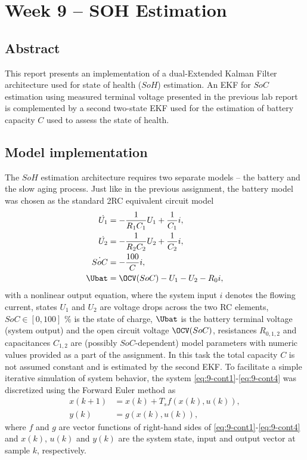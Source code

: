 
\chapter{Week 9 -- SOH Estimation}

\section{Abstract}
This report presents an implementation of a dual-Extended Kalman Filter architecture used for state of health ($SoH$) estimation. An EKF for $SoC$ estimation using measured terminal voltage presented in the previous lab report is complemented by a second two-state EKF used for the estimation of battery capacity $C$ used to assess the state of health.

\section{Model implementation}
\label{sec:9-one}

The $SoH$ estimation architecture requires two separate models -- the battery and the slow aging process.
Just like in the previous assignment, the battery model was chosen as the standard 2RC equivalent circuit model
\begin{align}
        \dot{U_1} &= -\frac{1}{R_1 C_1} U_1 + \frac{1}{C_1} i, \label{eq:9-cont1} \\
        \dot{U_2} &= -\frac{1}{R_2 C_2} U_2 + \frac{1}{C_2} i, \\
        \dot{SoC} &= -\frac{100}{C} i, \\
        \Ubat &= \OCV(SoC) - U_1 - U_2 - R_0i,
    \label{eq:9-cont4}
\end{align}
with a nonlinear output equation, where the system input $i$ denotes the flowing current, states $U_1$ and $U_2$ are voltage drops across the two RC elements, $SoC \in \left[0, 100\right]$ \% is the state of charge, $\Ubat$ is the battery terminal voltage (system output) and the open circuit voltage $\OCV(SoC)$, resistances $R_{0,1,2}$ and capacitances $C_{1,2}$ are (possibly $SoC$-dependent) model parameters with numeric values provided as a part of the assignment. In this task the total capacity $C$ is not assumed constant and is estimated by the second EKF.
To facilitate a simple iterative simulation of system behavior, the system \eqref{eq:9-cont1}-\eqref{eq:9-cont4} was discretized using the Forward Euler method as
\begin{equation}
\begin{split}
    x(k+1) &= x(k) + T_s f(x(k), u(k)), \\
    y(k) &= g(x(k), u(k)),
\end{split}
\label{eq:9-disc}
\end{equation}
where $f$ and $g$ are vector functions of right-hand sides of \eqref{eq:9-cont1}-\eqref{eq:9-cont4} and $x(k)$, $u(k)$ and $y(k)$ are the system state, input and output vector at sample $k$, respectively.

